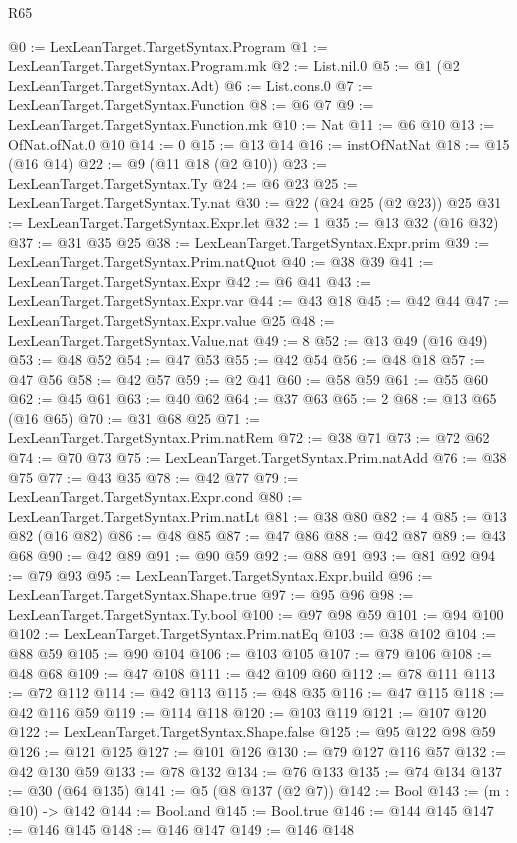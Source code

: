 \begin{lexlean}{R65}
\begin{coremodule}
@0 := LexLeanTarget.TargetSyntax.Program
@1 := LexLeanTarget.TargetSyntax.Program.mk
@2 := List.nil.{0}
@5 := @1 (@2 LexLeanTarget.TargetSyntax.Adt)
@6 := List.cons.{0}
@7 := LexLeanTarget.TargetSyntax.Function
@8 := @6 @7
@9 := LexLeanTarget.TargetSyntax.Function.mk
@10 := Nat
@11 := @6 @10
@13 := OfNat.ofNat.{0} @10
@14 := 0
@15 := @13 @14
@16 := instOfNatNat
@18 := @15 (@16 @14)
@22 := @9 (@11 @18 (@2 @10))
@23 := LexLeanTarget.TargetSyntax.Ty
@24 := @6 @23
@25 := LexLeanTarget.TargetSyntax.Ty.nat
@30 := @22 (@24 @25 (@2 @23)) @25
@31 := LexLeanTarget.TargetSyntax.Expr.let
@32 := 1
@35 := @13 @32 (@16 @32)
@37 := @31 @35 @25
@38 := LexLeanTarget.TargetSyntax.Expr.prim
@39 := LexLeanTarget.TargetSyntax.Prim.natQuot
@40 := @38 @39
@41 := LexLeanTarget.TargetSyntax.Expr
@42 := @6 @41
@43 := LexLeanTarget.TargetSyntax.Expr.var
@44 := @43 @18
@45 := @42 @44
@47 := LexLeanTarget.TargetSyntax.Expr.value @25
@48 := LexLeanTarget.TargetSyntax.Value.nat
@49 := 8
@52 := @13 @49 (@16 @49)
@53 := @48 @52
@54 := @47 @53
@55 := @42 @54
@56 := @48 @18
@57 := @47 @56
@58 := @42 @57
@59 := @2 @41
@60 := @58 @59
@61 := @55 @60
@62 := @45 @61
@63 := @40 @62
@64 := @37 @63
@65 := 2
@68 := @13 @65 (@16 @65)
@70 := @31 @68 @25
@71 := LexLeanTarget.TargetSyntax.Prim.natRem
@72 := @38 @71
@73 := @72 @62
@74 := @70 @73
@75 := LexLeanTarget.TargetSyntax.Prim.natAdd
@76 := @38 @75
@77 := @43 @35
@78 := @42 @77
@79 := LexLeanTarget.TargetSyntax.Expr.cond
@80 := LexLeanTarget.TargetSyntax.Prim.natLt
@81 := @38 @80
@82 := 4
@85 := @13 @82 (@16 @82)
@86 := @48 @85
@87 := @47 @86
@88 := @42 @87
@89 := @43 @68
@90 := @42 @89
@91 := @90 @59
@92 := @88 @91
@93 := @81 @92
@94 := @79 @93
@95 := LexLeanTarget.TargetSyntax.Expr.build
@96 := LexLeanTarget.TargetSyntax.Shape.true
@97 := @95 @96
@98 := LexLeanTarget.TargetSyntax.Ty.bool
@100 := @97 @98 @59
@101 := @94 @100
@102 := LexLeanTarget.TargetSyntax.Prim.natEq
@103 := @38 @102
@104 := @88 @59
@105 := @90 @104
@106 := @103 @105
@107 := @79 @106
@108 := @48 @68
@109 := @47 @108
@111 := @42 @109 @60
@112 := @78 @111
@113 := @72 @112
@114 := @42 @113
@115 := @48 @35
@116 := @47 @115
@118 := @42 @116 @59
@119 := @114 @118
@120 := @103 @119
@121 := @107 @120
@122 := LexLeanTarget.TargetSyntax.Shape.false
@125 := @95 @122 @98 @59
@126 := @121 @125
@127 := @101 @126
@130 := @79 @127 @116 @57
@132 := @42 @130 @59
@133 := @78 @132
@134 := @76 @133
@135 := @74 @134
@137 := @30 (@64 @135)
@141 := @5 (@8 @137 (@2 @7))
@142 := Bool
@143 := (m : @10) -> @142
@144 := Bool.and
@145 := Bool.true
@146 := @144 @145
@147 := @146 @145
@148 := @146 @147
@149 := @146 @148

\end{coremodule}
\end{lexlean}
